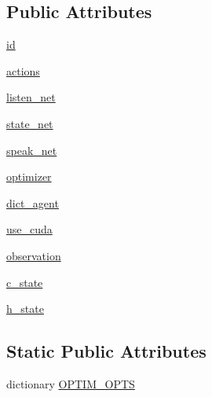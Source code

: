 \subsection*{Public Attributes}
\begin{DoxyCompactItemize}
\item 
\hyperlink{classtaskntalk_1_1coopgame__agent_1_1CooperativeGameAgent_a9bcc6892b7529585b21650ad868ea391}{id}
\item 
\hyperlink{classtaskntalk_1_1coopgame__agent_1_1CooperativeGameAgent_a22435d52361d12e68f01373d2a08e6b4}{actions}
\item 
\hyperlink{classtaskntalk_1_1coopgame__agent_1_1CooperativeGameAgent_aea47ea910ac44412e062f17546ce3f8d}{listen\+\_\+net}
\item 
\hyperlink{classtaskntalk_1_1coopgame__agent_1_1CooperativeGameAgent_a96326af2599078efb35a4c8d3a9a68dc}{state\+\_\+net}
\item 
\hyperlink{classtaskntalk_1_1coopgame__agent_1_1CooperativeGameAgent_a64a71d986aa5d8b1a0befa812a5c3873}{speak\+\_\+net}
\item 
\hyperlink{classtaskntalk_1_1coopgame__agent_1_1CooperativeGameAgent_a3060a1071b62f3e07a2a1ea9c8ebbc8f}{optimizer}
\item 
\hyperlink{classtaskntalk_1_1coopgame__agent_1_1CooperativeGameAgent_a808dc7ea4cd474ce629e585acee69649}{dict\+\_\+agent}
\item 
\hyperlink{classtaskntalk_1_1coopgame__agent_1_1CooperativeGameAgent_a69175c42c76b2d7957786410dc38cdb4}{use\+\_\+cuda}
\item 
\hyperlink{classtaskntalk_1_1coopgame__agent_1_1CooperativeGameAgent_a8e06cf94d70b9539ef2ebc267c2cd2b6}{observation}
\item 
\hyperlink{classtaskntalk_1_1coopgame__agent_1_1CooperativeGameAgent_a1770ee53d8906e8bea7276443b082773}{c\+\_\+state}
\item 
\hyperlink{classtaskntalk_1_1coopgame__agent_1_1CooperativeGameAgent_a6566451de24e35050b6a34c06ce77799}{h\+\_\+state}
\end{DoxyCompactItemize}
\subsection*{Static Public Attributes}
\begin{DoxyCompactItemize}
\item 
dictionary \hyperlink{classtaskntalk_1_1coopgame__agent_1_1CooperativeGameAgent_a04825c0e3eb0b0cbe5ade2833ca245e8}{O\+P\+T\+I\+M\+\_\+\+O\+P\+TS}
\end{DoxyCompactItemize}


